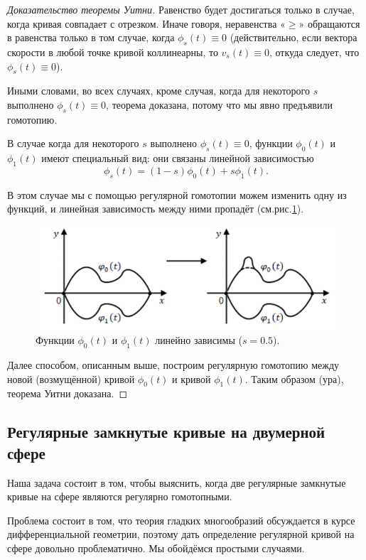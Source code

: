 \begin{proof}[Доказательство теоремы Уитни]
    Равенство будет достигаться только в случае, когда кривая совпадает с отрезком. Иначе говоря, неравенства «$\geqslant$» обращаются в равенства только в том случае, когда $\phi_s(t) \equiv 0$ (действительно, если вектора скорости в любой точке кривой коллинеарны, то $v_s(t) \equiv 0$, откуда следует, что $\phi_s(t) \equiv 0$).

    Иными словами, во всех случаях, кроме случая, когда для некоторого $s$ выполнено $\phi_s(t) \equiv 0$, теорема доказана, потому что мы явно предъявили гомотопию.

    В случае когда для некоторого $s$ выполнено $\phi_s(t) \equiv 0$, функции $\phi_0(t)$ и $\phi_1(t)$ имеют специальный вид: они связаны линейной зависимостью 
    \[\phi_s(t) = (1-s)\phi_0(t) + s\phi_1(t).\]

    В этом случае мы с помощью регулярной гомотопии можем изменить одну из функций, и линейная зависимость между ними пропадёт (см.рис.\ref{fig:c13.4}).

    \begin{figure}[ht]
        \centering
        \includegraphics[scale=0.7]{images/c13.4.png}
        \caption{Функции $\phi_0(t)$ и $\phi_1(t)$ линейно зависимы ($s = 0.5$).}
        \label{fig:c13.4}
    \end{figure}


    Далее способом, описанным выше, построим регулярную гомотопию между новой (возмущённой) кривой $\phi_0(t)$ и кривой $\phi_1(t)$. Таким образом (ура), теорема Уитни доказана.
\end{proof} 

\subsection{Регулярные замкнутые кривые на двумерной сфере}
Наша задача состоит в том, чтобы выяснить, когда две регулярные замкнутые кривые на сфере являются регулярно гомотопными.

Проблема состоит в том, что теория гладких многообразий обсуждается в курсе дифференциальной геометрии, поэтому дать определение регулярной кривой на сфере довольно проблематично. Мы обойдёмся простыми случаями.


